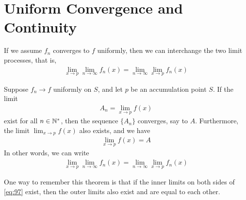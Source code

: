\documentclass[thmcnt=section, 12pt]{my-elegantbook}
\begin{document}

\section{Uniform Convergence and Continuity}


If we assume $f_n$ converges to $f$ uniformly, then we can interchange the two limit processes, that is, 
\begin{align*}
    \lim_{x \to p} \lim_{n \to \infty} f_n(x)
    = \lim_{n \to \infty} \lim_{x \to p} f_n(x)
\end{align*}

\begin{theorem} \label{thm:43}
    Suppose $f_n \to f$ uniformly on $S$, and let $p$ be an accumulation point $S$. If the limit
    \begin{align*}
        A_n = \lim_{x \to p} f(x)
    \end{align*}
    exist for all $n \in \mathbb{N}^\ast$, then the sequence $\{A_n\}$ converges, say to $A$. Furthermore, the limit $\lim_{x \to p}f(x)$ also exists, and we have 
    \begin{align*}
        \lim_{x \to p}f(x) = A
    \end{align*}
    In other words, we can write 
    \begin{align}
        \lim_{x \to p} \lim_{n \to \infty} f_n(x)
        = \lim_{n \to \infty} \lim_{x \to p} f_n(x)
        \label{eq:97}
    \end{align}
\end{theorem}

\begin{note}
    One way to remember this theorem is that if the inner limits on both sides of \eqref{eq:97} exist, then the outer limits also exist and are equal to each other.
\end{note}
\end{document}
